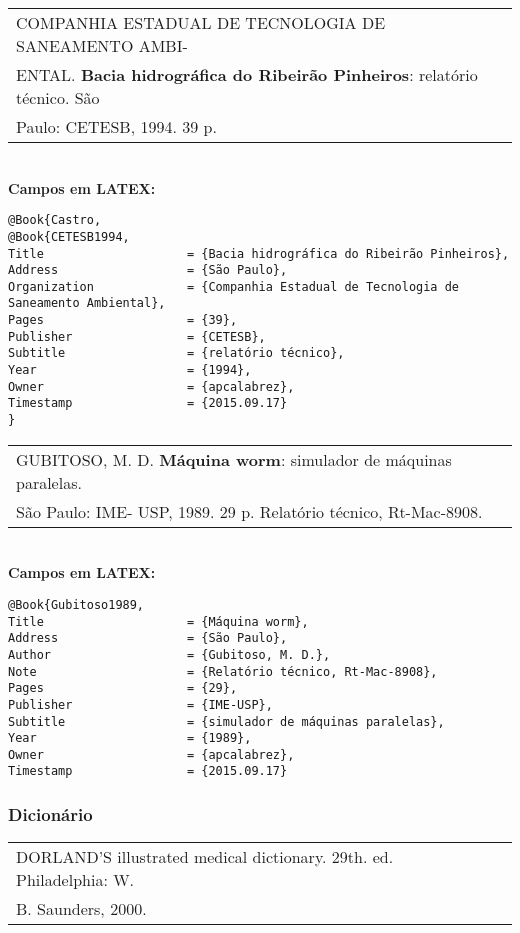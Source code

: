 \begin{tabular}{|l|c|} \hline
COMPANHIA ESTADUAL DE TECNOLOGIA DE SANEAMENTO AMBI-\\ENTAL. \textbf{Bacia hidrográfica do Ribeirão Pinheiros}: relatório técnico. São \\Paulo: CETESB, 1994. 39 p.   \\\hline
\end{tabular}\\

\textbf{Campos em LATEX:}

\begin{verbatim}
@Book{Castro,
@Book{CETESB1994,
Title                    = {Bacia hidrográfica do Ribeirão Pinheiros},
Address                  = {São Paulo},
Organization             = {Companhia Estadual de Tecnologia de 
Saneamento Ambiental},
Pages                    = {39},
Publisher                = {CETESB},
Subtitle                 = {relatório técnico},
Year                     = {1994},
Owner                    = {apcalabrez},
Timestamp                = {2015.09.17}
}
\end{verbatim}

\begin{tabular}{|l|c|} \hline
GUBITOSO, M. D. \textbf{Máquina worm}: simulador de máquinas paralelas. \\São Paulo: IME- USP, 1989. 29 p. Relatório técnico, Rt-Mac-8908.   \\\hline
\end{tabular}\\

\textbf{Campos em LATEX:}

\begin{verbatim}
@Book{Gubitoso1989,
Title                    = {Máquina worm},
Address                  = {São Paulo},
Author                   = {Gubitoso, M. D.},
Note                     = {Relatório técnico, Rt-Mac-8908},
Pages                    = {29},
Publisher                = {IME-USP},
Subtitle                 = {simulador de máquinas paralelas},
Year                     = {1989},
Owner                    = {apcalabrez},
Timestamp                = {2015.09.17}
\end{verbatim}

\subsubsection{Dicionário}

\begin{tabular}{|l|c|} \hline
DORLAND'S illustrated medical dictionary. 29th. ed. Philadelphia: W.\\B. Saunders, 2000.   \\\hline
\end{tabular}\\



